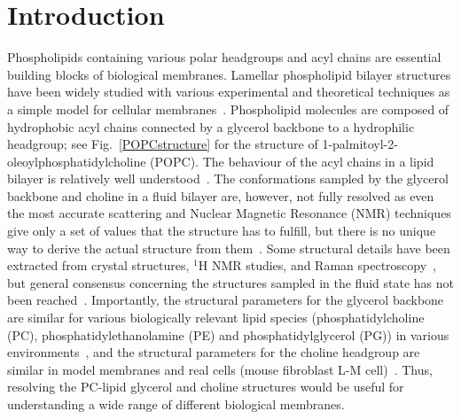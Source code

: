 \documentclass[journal=jpcbfk,manuscript=article]{achemso}
\begin{document}
\section{Introduction}

Phospholipids containing various polar headgroups and acyl chains are essential building blocks of 
biological membranes. Lamellar phospholipid bilayer structures have been widely studied with various experimental 
and theoretical techniques as a simple model for cellular membranes~\cite{lipowsky95,tieleman97,klauda08,edholm08,tieleman10,piggot12,rabinovich13,marsh13}. 
Phospholipid molecules are composed of hydrophobic acyl chains connected by a glycerol backbone to a hydrophilic headgroup;
see Fig.~\ref{POPCstructure} for the structure of 1-palmitoyl-2-oleoyl\-phosphatidyl\-choline (POPC).
The behaviour of the acyl chains in a lipid bilayer is relatively well understood~\cite{Israelachvili80,lipowsky95,tieleman97,klauda08,edholm08,tieleman10,marsh13}. 
The conformations sampled by the glycerol backbone and choline in a fluid bilayer are, however, not fully 
resolved as even the most accurate scattering and Nuclear Magnetic Resonance (NMR)
techniques give only a set of values that the structure has to fulfill, but
there is no unique way to derive the actual structure from them~\cite{seelig77b,skarjune79,Israelachvili80,jacobs80,davis83,strenk85,akutsu91,hong95b,hong96,semchyschyn04}.
Some structural details have been extracted from crystal structures, $^1$H NMR studies, and Raman spectroscopy~\cite{hauser80,hauser81,hauser81b,akutsu81b,pascher92,hauser88,marsh06},
but general consensus concerning the structures sampled in the fluid state has not been reached~\cite{seelig77b,skarjune79,Israelachvili80,jacobs80,davis83,strenk85,hauser88,akutsu91,hong95b,hong96,semchyschyn04,marsh06}. 
Importantly, the structural parameters for the glycerol backbone are similar for various biologically
relevant lipid species (phosphatidylcholine (PC), phosphatidylethanolamine (PE) and phosphatidylglycerol (PG)) 
in various environments~\cite{gally81}, and the structural parameters for the choline headgroup are similar in model membranes and
real cells (mouse fibroblast L-M cell)~\cite{scherer87}.
Thus, resolving the PC-lipid glycerol and choline structures would be 
useful for understanding a wide range of different biological membranes.
\end{document}
